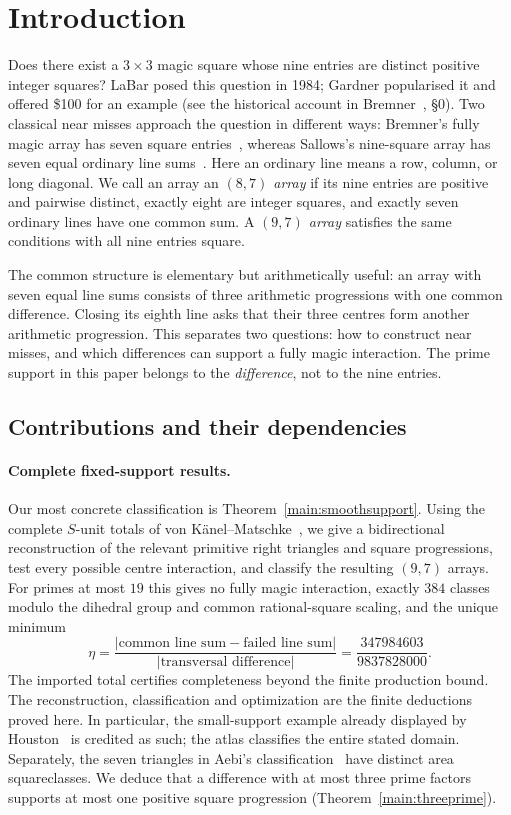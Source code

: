 \section{Introduction}\label{sec:intro}

Does there exist a $3\times3$ magic square whose nine entries are distinct
positive integer squares? LaBar posed this question in 1984; Gardner
popularised it and offered \$100 for an example (see the historical account
in Bremner~\cite{BRE99}, \S0). Two classical near misses approach the
question in different ways: Bremner's fully magic array has seven square
entries~\cite{BRE99}, whereas Sallows's nine-square array has seven equal
ordinary line sums~\cite{SAL97}. Here an ordinary line means a row, column,
or long diagonal. We call an array an \emph{$(8,7)$ array} if its nine
entries are positive and pairwise distinct, exactly eight are integer
squares, and exactly seven ordinary lines have one common sum. A
\emph{$(9,7)$ array} satisfies the same conditions with all nine entries
square.

The common structure is elementary but arithmetically useful: an array
with seven equal line sums consists of three arithmetic progressions
with one common difference. Closing its eighth line asks that their three
centres form another arithmetic progression. This separates two questions:
how to construct near misses, and which differences can support a fully
magic interaction. The prime support in this paper belongs to the
\emph{difference}, not to the nine entries.

\subsection{Contributions and their dependencies}

\paragraph{Complete fixed-support results.}
Our most concrete classification is Theorem~\ref{main:smoothsupport}.
Using the complete $S$-unit totals of von K\"anel--Matschke~\cite{VKM16},
we give a bidirectional reconstruction of the relevant primitive right
triangles and square progressions, test every possible centre interaction,
and classify the resulting $(9,7)$ arrays. For primes at most $19$ this
gives no fully magic interaction, exactly $384$ classes modulo the
dihedral group and common rational-square scaling, and the unique minimum
\[
\eta=\frac{|\text{common line sum}-\text{failed line sum}|}
{|\text{transversal difference}|}
=\frac{347984603}{9837828000}.
\]
The imported total certifies completeness beyond the finite production
bound. The reconstruction, classification and optimization are the finite
deductions proved here. In particular, the small-support example already
displayed by Houston~\cite{HOU16B} is credited as such; the atlas
classifies the entire stated domain. Separately, the seven triangles in
Aebi's classification~\cite{AEB26} have distinct area squareclasses. We
deduce that a difference with at most three prime factors supports at most
one positive square progression (Theorem~\ref{main:threeprime}).


